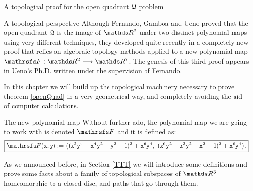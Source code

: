 \documentclass[11pt, a4paper, english, twoside, notitlepage, openright]{report}
\begin{document}
\begin{chapter}{A topological proof for the open quadrant $\mathcal{Q}$ problem}
\begin{section}{A topological perspective}
Although Fernando, Gamboa and Ueno proved that the open quadrant $\mathcal{Q}$ is the image of $\R^2$ under two distinct polynomial maps using very different techniques, they developed quite recently in \cite{fgu} a completely new proof that relies on algebraic topology methods applied to a new polynomial map $\FFF: \R^2 \longrightarrow \R^2$. The genesis of this third proof appears in Ueno's Ph.D. \cite{u} written under the supervision of Fernando. 

In this chapter we will build up the topological machinery necessary to prove theorem \ref{openQuad} in a very geometrical way, and completely avoiding the aid of computer calculations.
\begin{subsection}{The new polynomial map}
Without further ado, the polynomial map we are going to work with is denoted $\FFF$ and it is defined as:
\begin{equation*}
\boxed{
\FFF({\tt x}, {\tt y}) := \big(({\tt x}^2{\tt y}^4+{\tt x}^4{\tt y}^2-{\tt y}^2-1)^2+{\tt x}^6{\tt y}^4,\ ({\tt x}^6{\tt y}^2+{\tt x}^2{\tt y}^2-{\tt x}^2-1)^2+{\tt x}^6{\tt y}^4\big).
}
\end{equation*}

As we announced before, in Section \ref{TTT} we will introduce some definitions and prove some facts about a family of topological subspaces of $\R^3$ homeomorphic to a closed disc, and paths that go through them.

\vspace{1mm}


\end{subsection}
\end{section}
\end{chapter}
\end{document}

